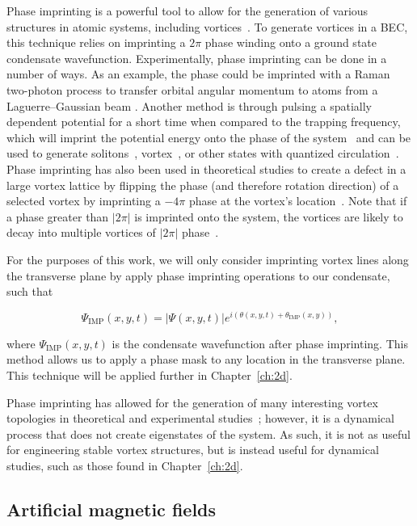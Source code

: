 Phase imprinting is a powerful tool to allow for the generation of various structures in atomic systems, including vortices~\cite{kumar2018, moulder2012, burger1999, denschlag2000, wu2002}.
To generate vortices in a BEC, this technique relies on imprinting a $2\pi$ phase winding onto a ground state condensate wavefunction.
Experimentally, phase imprinting can be done in a number of ways.
As an example, the phase could be imprinted with a Raman two-photon process to transfer orbital angular momentum to atoms from a Laguerre--Gaussian beam \cite{moulder2012, ryu2007}.
Another method is through pulsing a spatially dependent potential for a short time when compared to the trapping frequency, which will imprint the potential energy onto the phase of the system~\cite{kasevich1991} and can be used to generate solitons~\cite{denschlag2000}, vortex~\cite{gajda1999}, or other states with quantized circulation~\cite{kumar2018}.
Phase imprinting has also been used in theoretical studies to create a defect in a large vortex lattice by flipping the phase (and therefore rotation direction) of a selected vortex by imprinting a $-4\pi$ phase at the vortex's location~\cite{o2016topo}.
Note that if a phase greater than $|2\pi|$ is imprinted onto the system, the vortices are likely to decay into multiple vortices of $|2\pi|$ phase~\cite{shin2004}.

For the purposes of this work, we will only consider imprinting vortex lines along the transverse plane by apply phase imprinting operations to our condensate, such that

\begin{equation}
\Psi_{\text{IMP}}(x,y,t) = |\Psi(x,y,t)|e^{i(\theta(x,y,t) + \theta_{\text{IMP}}(x,y))},
\end{equation}

\noindent where $\Psi_{\text{IMP}}(x,y,t)$ is the condensate wavefunction after phase imprinting.
This method allows us to apply a phase mask to any location in the transverse plane.
This technique will be applied further in Chapter~\ref{ch:2d}.

Phase imprinting has allowed for the generation of many interesting vortex topologies in theoretical and experimental studies~\cite{white2014, maucher2016}; however, it is a dynamical process that does not create eigenstates of the system.
As such, it is not as useful for engineering stable vortex structures, but is instead useful for dynamical studies, such as those found in Chapter~\ref{ch:2d}.

\subsection{Artificial magnetic fields}
\label{sec:gauge}

